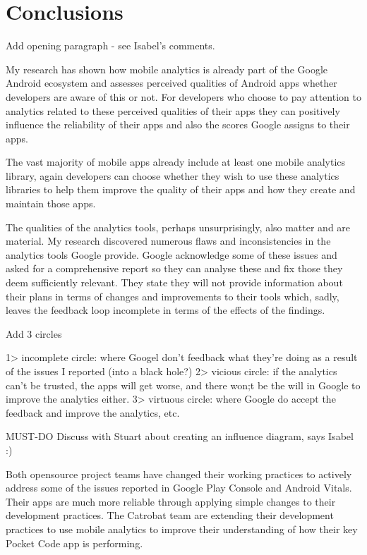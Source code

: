\chapter{Conclusions}
Add opening paragraph - see Isabel's comments. 

My research has shown how mobile analytics is already part of the Google Android ecosystem and assesses perceived qualities 
of Android apps whether developers are aware of this or not. For developers who choose to pay attention to analytics related to these perceived qualities of their apps they can positively influence the reliability of their apps and also the scores Google assigns to their apps. 

The vast majority of mobile apps already include at least one mobile analytics library, again developers can choose whether they wish to use these analytics libraries to help them improve the quality of their apps and how they create and maintain those apps. 

The qualities of the analytics tools, perhaps unsurprisingly, also matter and are material. My research discovered numerous flaws and inconsistencies in the analytics tools Google provide. Google acknowledge some of these issues and asked for a comprehensive report so they can analyse these and fix those they deem sufficiently relevant. They state they will not provide information about their plans in terms of changes and improvements to their tools which, sadly, leaves the feedback loop incomplete in terms of the effects of the findings.

Add 3 circles 

1> incomplete circle: where Googel don't feedback what they're doing as a result of the issues I reported (into a black hole?)
2> vicious circle: if the analytics can't be trusted, the apps will get worse, and there won;t be the will in Google to improve the analytics either.
3> virtuous circle: where Google do accept the feedback and improve the analytics, etc. 

MUST-DO Discuss with Stuart about creating an influence diagram, says Isabel :) 

Both opensource project teams have changed their working practices to actively address some of the issues reported in Google Play Console and Android Vitals. Their apps are much more reliable through applying simple changes to their development practices. The Catrobat team are extending their development practices to use mobile analytics to improve their understanding of how their key Pocket Code app is performing.

